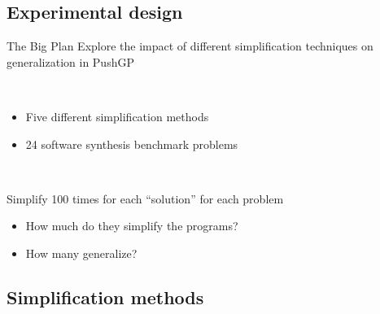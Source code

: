 \documentclass{beamer}
\begin{document}
\subsection{Experimental design}

\begin{frame}{The Big Plan}
Explore the impact of different simplification techniques on generalization in PushGP 

~

\begin{itemize}
	\item Five different simplification methods
	\item 24 software synthesis benchmark problems
\end{itemize}

~ 

Simplify 100 times for each ``solution'' for each problem
\begin{itemize}
	\item How much do they simplify the programs?
	\item How many generalize?
\end{itemize} 

\end{frame}

\subsection{Simplification methods}
\end{document}
